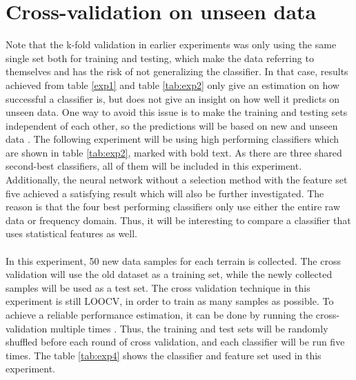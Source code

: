 \documentclass[USenglish]{ifimaster}  %
\begin{document}
\section{Cross-validation on unseen data} \label{seq:crossunseen}
Note that the k-fold validation in earlier experiments was only using the same single set both for training and testing, which make the data referring to themselves and has the risk of not generalizing the classifier. In that case, results achieved from table \ref{exp1} and table \ref{tab:exp2} only give an estimation on how successful a classifier is, but does not give an insight on how well it predicts on unseen data. One way to avoid this issue is to make the training and testing sets independent of each other, so the predictions will be based on new and unseen data \cite{26b23e912c654fe4b7478fd910130195}. The following experiment will be using high performing classifiers which are shown in table \ref{tab:exp2}, marked with bold text. As there are three shared second-best classifiers, all of them will be included in this experiment. Additionally, the neural network without a selection method with the feature set five achieved a satisfying result which will also be further investigated. The reason is that the four best performing classifiers only use either the entire raw data or frequency domain. Thus, it will be interesting to compare a classifier that uses statistical features as well.
\\
\\
In this experiment, 50 new data samples for each terrain is collected. The cross validation will use the old dataset as a training set, while the newly collected samples will be used as a test set. The cross validation technique in this experiment is still LOOCV, in order to train as many samples as possible. To achieve a reliable performance estimation, it can be done by running the cross-validation multiple times \cite{Refaeilzadeh2009}. Thus, the training and test sets will be randomly shuffled before each round of cross validation, and each classifier will be run five times. The table \ref{tab:exp4} shows the classifier and feature set used in this experiment.
\end{document}

